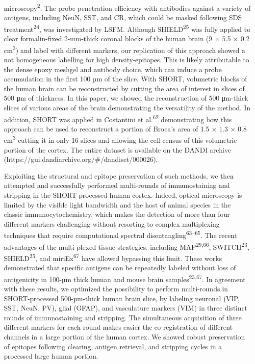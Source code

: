 \documentclass{article}
\begin{document}
microscopy\textsuperscript{2}. The probe penetration efficiency with antibodies against a variety of antigens, including NeuN, SST, and CR, which could be masked following SDS treatment\textsuperscript{24}, was investigated by LSFM. Although SHIELD\textsuperscript{25} was fully applied to clear formalin-fixed 2-mm-thick coronal blocks of the human brain (9 × 5.5 × 0.2 cm\textsuperscript{3}) and label with different markers, our replication of this approach showed a not homogeneous labelling for high density-epitopes. This is likely attributable to the dense epoxy meshgel and antibody choice, which can induce a probe accumulation in the first 100 µm of the slice. With SHORT, volumetric blocks of the human brain can be reconstructed by cutting the area of interest in slices of 500 μm of thickness. In this paper, we showed the reconstruction of 500 μm-thick slices of various areas of the brain demonstrating the versatility of the method. In addition, SHORT was applied in Costantini et al.\textsuperscript{62} demonstrating how this approach can be used to reconstruct a portion of Broca’s area of 1.5 × 1.3 × 0.8 cm\textsuperscript{3} cutting it in only 16 slices and allowing the cell census of this volumetric portion of the cortex. The entire dataset is available on the DANDI archive (https://gui.dandiarchive.org/\#/dandiset/000026).

Exploiting the structural and epitope preservation of such methods, we then attempted and successfully performed multi-rounds of immunostaining and stripping in the SHORT-processed human cortex. Indeed, optical microscopy is limited by the visible light bandwidth and the host of animal species in the classic immunocytochemistry, which makes the detection of more than four different markers challenging without resorting to complex multiplexing techniques that require computational spectral disentangling\textsuperscript{63–65}. The recent advantages of the multi-plexed tissue strategies, including MAP\textsuperscript{29,66}, SWITCH\textsuperscript{23}, SHIELD\textsuperscript{25}, and miriEx\textsuperscript{67} have allowed bypassing this limit. These works demonstrated that specific antigens can be repeatedly labeled without loss of antigenicity in 100-µm thick human and mouse brain samples\textsuperscript{23,67}. In agreement with these results, we optimized the possibility to perform multi-rounds in SHORT-processed 500-µm-thick human brain slice, by labeling neuronal (VIP, SST, NeuN, PV), glial (GFAP), and vasculature markers (VIM) in three distinct rounds of immunostaining and stripping. The simultaneous acquisition of three different markers for each round makes easier the co-registration of different channels in a large portion of the human cortex. We showed robust preservation of epitopes following clearing, antigen retrieval, and stripping cycles in a processed large human portion.
\end{document}
